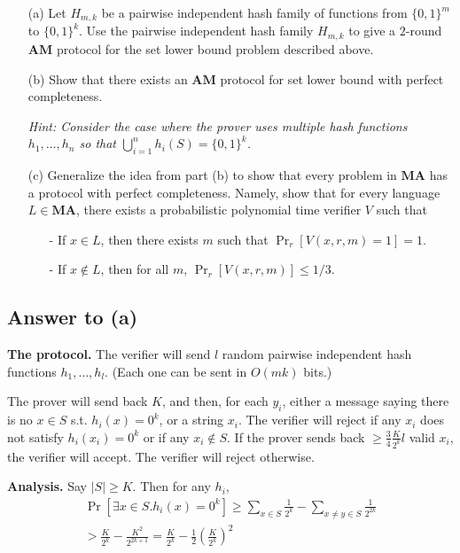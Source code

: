 \documentclass{article}
\newcommand{\AM}{\mathbf{AM}}
\newcommand{\MA}{\mathbf{MA}}
\begin{document}
\begin{enumerate}
    \item[(a)] Let $H_{m,k}$ be a pairwise independent hash family of functions from $\{0,1\}^m$ to $\{0,1\}^k$. Use the pairwise independent hash family $H_{m,k}$ to give a $2$-round $\AM$ protocol for the set lower bound problem described above.
    
    \item[(b)] Show that there exists an $\AM$ protocol for set lower bound with perfect completeness.

    \emph{Hint: Consider the case where the prover uses multiple hash functions $h_1,\dots, h_n$ so that $\bigcup_{i = 1}^n h_i(S) = \{0,1\}^k$.}
    
    \item[(c)] Generalize the idea from part (b) to show that every problem in $\MA$ has a protocol with perfect completeness. Namely, show that for every language $L\in \MA$, there exists a probabilistic polynomial time verifier $V$ such that 
    \begin{enumerate}
        \item[-] If $x\in L$, then there exists $m$ such that $\Pr_r[V(x,r,m) = 1] = 1$.
        \item[-] If $x\not\in L$, then for all $m$, $\Pr_r[V(x,r,m)]\le 1/3$.
    \end{enumerate}
\end{enumerate}

\newpage
\subsection*{Answer to (a)}

\textbf{The protocol.} The verifier will send $l$ random pairwise independent hash functions $h_1, \dots, h_l$.  (Each one can be sent in $O(mk)$ bits.)

The prover will send back $K$, and then, for each $y_i$, either a message saying there is no $x \in S$ s.t. $h_i(x) = 0^k$, or a string $x_i$.
The verifier will reject if any $x_i$ does not satisfy $h_i(x_i) = 0^k$ or if any $x_i \notin S$.
If the prover sends back $\geq \frac{3}{4}\frac{K}{2^k}l$ valid $x_i$, the verifier will accept.  The verifier will reject otherwise.

\medskip
\noindent \textbf{Analysis.}
Say $|S| \geq K$.
Then for any $h_i$,
\begin{multline*}
	\Pr[\exists x \in S . h_i(x) = 0^k]
	\geq \sum_{x \in S}\frac{1}{2^k} - \sum_{x \neq y \in S}\frac{1}{2^{2k}} \\
	> \frac{K}{2^k} - \frac{K^2}{2^{2k + 1}}
	= \frac{K}{2^k} - \frac{1}{2} (\frac{K}{2^k})^2
\end{multline*}
\end{document}
